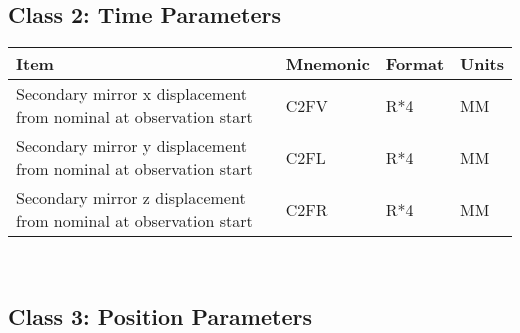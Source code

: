 \subsection{Class 2: Time Parameters}


\begin{tabular}{||l|l|l|l||} \hline
Item                      & Mnemonic & Format & Units \\ \hline
Secondary mirror x displacement from nominal at observation start  & C2FV     & R*4    &  MM   \\
Secondary mirror y displacement from nominal at observation start  & C2FL     & R*4    &  MM   \\
Secondary mirror z displacement from nominal at observation start  & C2FR     & R*4    &  MM   \\ \hline
\end{tabular}
 \\




\subsection{Class 3: Position Parameters}


